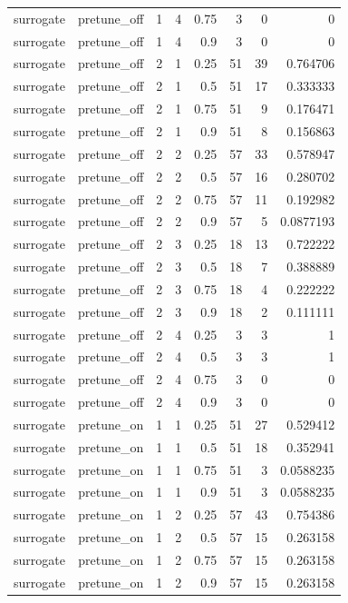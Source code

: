 \begin{table}[htbp]
\begin{tabular}{lrrrrrrr}
surrogate & pretune\_off & 1 & 4 & 0.75 & 3 & 0 & 0 \\
surrogate & pretune\_off & 1 & 4 & 0.9 & 3 & 0 & 0 \\
surrogate & pretune\_off & 2 & 1 & 0.25 & 51 & 39 & 0.764706 \\
surrogate & pretune\_off & 2 & 1 & 0.5 & 51 & 17 & 0.333333 \\
surrogate & pretune\_off & 2 & 1 & 0.75 & 51 & 9 & 0.176471 \\
surrogate & pretune\_off & 2 & 1 & 0.9 & 51 & 8 & 0.156863 \\
surrogate & pretune\_off & 2 & 2 & 0.25 & 57 & 33 & 0.578947 \\
surrogate & pretune\_off & 2 & 2 & 0.5 & 57 & 16 & 0.280702 \\
surrogate & pretune\_off & 2 & 2 & 0.75 & 57 & 11 & 0.192982 \\
surrogate & pretune\_off & 2 & 2 & 0.9 & 57 & 5 & 0.0877193 \\
surrogate & pretune\_off & 2 & 3 & 0.25 & 18 & 13 & 0.722222 \\
surrogate & pretune\_off & 2 & 3 & 0.5 & 18 & 7 & 0.388889 \\
surrogate & pretune\_off & 2 & 3 & 0.75 & 18 & 4 & 0.222222 \\
surrogate & pretune\_off & 2 & 3 & 0.9 & 18 & 2 & 0.111111 \\
surrogate & pretune\_off & 2 & 4 & 0.25 & 3 & 3 & 1 \\
surrogate & pretune\_off & 2 & 4 & 0.5 & 3 & 3 & 1 \\
surrogate & pretune\_off & 2 & 4 & 0.75 & 3 & 0 & 0 \\
surrogate & pretune\_off & 2 & 4 & 0.9 & 3 & 0 & 0 \\
surrogate & pretune\_on & 1 & 1 & 0.25 & 51 & 27 & 0.529412 \\
surrogate & pretune\_on & 1 & 1 & 0.5 & 51 & 18 & 0.352941 \\
surrogate & pretune\_on & 1 & 1 & 0.75 & 51 & 3 & 0.0588235 \\
surrogate & pretune\_on & 1 & 1 & 0.9 & 51 & 3 & 0.0588235 \\
surrogate & pretune\_on & 1 & 2 & 0.25 & 57 & 43 & 0.754386 \\
surrogate & pretune\_on & 1 & 2 & 0.5 & 57 & 15 & 0.263158 \\
surrogate & pretune\_on & 1 & 2 & 0.75 & 57 & 15 & 0.263158 \\
surrogate & pretune\_on & 1 & 2 & 0.9 & 57 & 15 & 0.263158 \\

\end{tabular}
\end{table}
